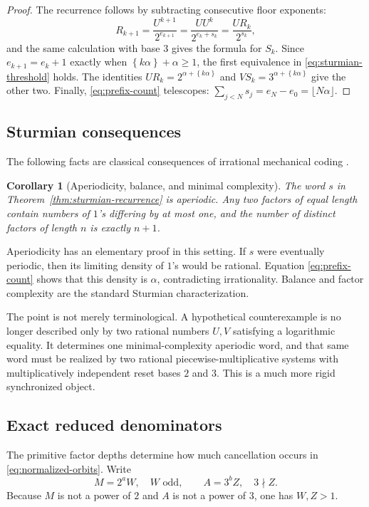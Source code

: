 \documentclass[11pt,oneside]{article}
\newtheorem{corollary}[theorem]{Corollary}
\theoremstyle{definition}
\theoremstyle{remark}
\newcommand{\fract}[1]{\left\{#1\right\}}
\begin{document}
\begin{proof}
The recurrence follows by subtracting consecutive floor exponents:
\[
  R_{k+1}
  =\frac{U^{k+1}}{2^{e_{k+1}}}
  =\frac{U U^k}{2^{e_k+s_k}}
  =\frac{UR_k}{2^{s_k}},
\]
and the same calculation with base $3$ gives the formula for $S_k$.  Since
$e_{k+1}=e_k+1$ exactly when $\fract{k\alpha}+\alpha\ge1$, the first equivalence in
\eqref{eq:sturmian-threshold} holds.  The identities
$UR_k=2^{\alpha+\fract{k\alpha}}$ and
$VS_k=3^{\alpha+\fract{k\alpha}}$ give the other two.  Finally,
\eqref{eq:prefix-count} telescopes:
$\sum_{j<N}s_j=e_N-e_0=\lfloor N\alpha\rfloor$.
\end{proof}

\subsection{Sturmian consequences}

The following facts are classical consequences of irrational mechanical coding
\cite{MorseHedlund1940,Lothaire2002}.

\begin{corollary}[Aperiodicity, balance, and minimal complexity]\label{cor:sturmian}
The word $s$ in Theorem~\ref{thm:sturmian-recurrence} is aperiodic.  Any two factors of equal
length contain numbers of $1$'s differing by at most one, and the number of distinct factors
of length $n$ is exactly $n+1$.
\end{corollary}

Aperiodicity has an elementary proof in this setting.  If $s$ were eventually periodic, then
its limiting density of $1$'s would be rational.  Equation \eqref{eq:prefix-count} shows that
this density is $\alpha$, contradicting irrationality.  Balance and factor complexity are the
standard Sturmian characterization.

The point is not merely terminological.  A hypothetical counterexample is no longer described
only by two rational numbers $U,V$ satisfying a logarithmic equality.  It determines one
minimal-complexity aperiodic word, and that same word must be realized by two rational
piecewise-multiplicative systems with multiplicatively independent reset bases $2$ and $3$.
This is a much more rigid synchronized object.

\subsection{Exact reduced denominators}

The primitive factor depths determine how much cancellation occurs in
\eqref{eq:normalized-orbits}.  Write
\[
  M=2^aW,\quad W\text{ odd},
  \qquad
  A=3^bZ,\quad 3\nmid Z.
\]
Because $M$ is not a power of $2$ and $A$ is not a power of $3$, one has $W,Z>1$.
\end{document}
